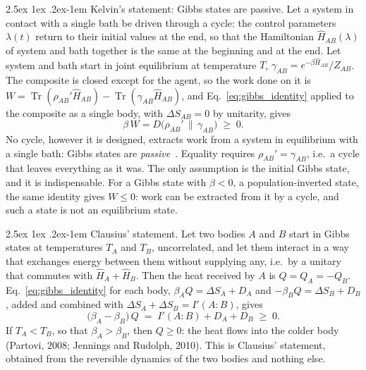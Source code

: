 \documentclass[10pt,a4paper]{article}
\makeatletter
\renewcommand{\paragraph}{\@startsection{paragraph}{4}{\z@}%
  {2.5ex \@plus 1ex \@minus .2ex}{-1em}%
  {\normalfont\fontsize{14pt}{17pt}\selectfont\bfseries}}
\newcommand{\Tr}{\operatorname{Tr}}
\makeatother
\begin{document}
\paragraph{Kelvin's statement: Gibbs states are passive.}
Let a system in contact with a single bath be driven through a cycle: the control parameters $ \lambda(t) $ return to their initial values at the end, so that the Hamiltonian $ \hat H_{AB}(\lambda) $ of system and bath together is the same at the beginning and at the end.
Let system and bath start in joint equilibrium at temperature $ T $, $ \gamma_{AB} = e^{-\beta\hat H_{AB}}/Z_{AB} $.
The composite is closed except for the agent, so the work done on it is $ W = \Tr(\rho_{AB}'\hat H_{AB}) - \Tr(\gamma_{AB}\hat H_{AB}) $, and Eq.~\eqref{eq:gibbs_identity} applied to the composite as a single body, with $ \Delta S_{AB} = 0 $ by unitarity, gives
\begin{equation}\label{eq:passivity}
  \beta\,W = D\big(\rho_{AB}'\,\big\|\,\gamma_{AB}\big) \;\geq\; 0 .
\end{equation}
No cycle, however it is designed, extracts work from a system in equilibrium with a single bath: Gibbs states are \emph{passive}~\cite{PuszWoronowicz1978,Lenard1978}.
Equality requires $ \rho_{AB}' = \gamma_{AB} $, i.e.\ a cycle that leaves everything as it was.
The only assumption is the initial Gibbs state, and it is indispensable.
For a Gibbs state with $ \beta < 0 $, a population-inverted state, the same identity gives $ W \leq 0 $: work can be extracted from it by a cycle, and such a state is not an equilibrium state.

\paragraph{Clausius' statement.}
Let two bodies $ A $ and $ B $ start in Gibbs states at temperatures $ T_A $ and $ T_B $, uncorrelated, and let them interact in a way that exchanges energy between them without supplying any, i.e.\ by a unitary that commutes with $ \hat H_A + \hat H_B $.
Then the heat received by $ A $ is $ Q = Q_A = -Q_B $.
Eq.~\eqref{eq:gibbs_identity} for each body, $ \beta_AQ = \Delta S_A + D_A $ and $ -\beta_BQ = \Delta S_B + D_B $, added and combined with $ \Delta S_A + \Delta S_B = I'(A{:}B) $, gives
\begin{equation}\label{eq:clausius_micro}
  \big(\beta_A - \beta_B\big)\,Q \;=\; I'(A{:}B) + D_A + D_B \;\geq\; 0 .
\end{equation}
If $ T_A < T_B $, so that $ \beta_A > \beta_B $, then $ Q \geq 0 $: the heat flows into the colder body (Partovi, 2008; Jennings and Rudolph, 2010).
This is Clausius' statement, obtained from the reversible dynamics of the two bodies and nothing else.
\end{document}
